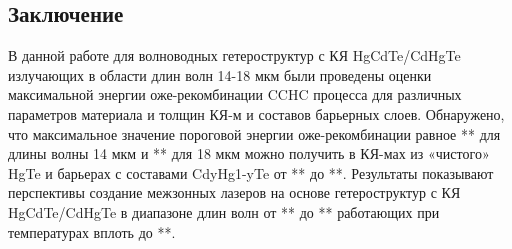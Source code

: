 \documentclass[../main.tex]{subfiles}
\begin{document}
    \begin{center}
        \chapter{Заключение}
    \end{center}

    В данной работе для волноводных гетероструктур с КЯ HgCdTe/CdHgTe излучающих в области длин волн 14-18 мкм были проведены оценки максимальной
    энергии оже-рекомбинации CCHC процесса для различных параметров материала и толщин КЯ-м и составов барьерных слоев. Обнаружено, что 
    максимальное значение пороговой энергии оже-рекомбинации равное ** для длины волны 14 мкм и ** для 18 мкм можно получить в КЯ-мах из «чистого»  
    HgTe и барьерах с составами  CdyHg1-yTe от ** до **.  Результаты показывают перспективы создание межзонных лазеров на основе  гетероструктур с 
    КЯ HgCdTe/CdHgTe в диапазоне длин волн от ** до ** работающих при температурах вплоть до **. 
\end{document}
